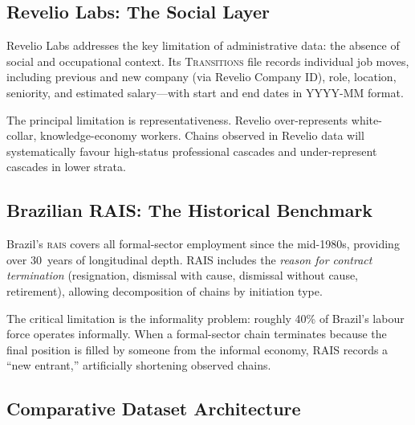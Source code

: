 \documentclass[a4paper]{tufte-handout}
\begin{document}
\subsection{Revelio Labs: The Social Layer}

Revelio Labs addresses the key limitation of administrative data: the absence
of social and occupational context.
Its \textsc{Transitions} file records individual job moves, including previous
and new company (via Revelio Company ID), role, location, seniority, and
estimated salary---with start and end dates in YYYY-MM format.

The principal limitation is representativeness. Revelio over-represents
white-collar, knowledge-economy workers. Chains observed in Revelio data will
systematically favour high-status professional cascades and under-represent
cascades in lower strata.

\subsection{Brazilian RAIS: The Historical Benchmark}

Brazil's \textsc{rais} covers all formal-sector employment since the mid-1980s,
providing over 30~years of longitudinal depth. RAIS includes the \emph{reason
	for contract termination} (resignation, dismissal with cause, dismissal without
cause, retirement), allowing decomposition of chains by initiation type.

The critical limitation is the informality problem: roughly 40\% of Brazil's
labour force operates informally. When a formal-sector chain terminates because
the final position is filled by someone from the informal economy, RAIS records
a ``new entrant,'' artificially shortening observed chains.

\subsection{Comparative Dataset Architecture}
\end{document}
